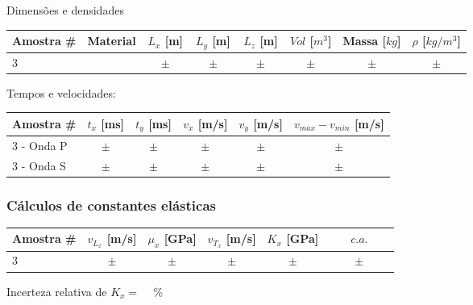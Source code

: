 \documentclass[a4paper,12pt]{article}  %
\begin{document}
Dimensões e densidades
\begin{center}
	\begin{tabular}{|l|c|c|c|c|c|c|c|}
	\hline
	 Amostra \# & Material  &  $L_x$ [m]  &   $L_y$ [m]  &  $L_z$ [m]  & $Vol$ [$m^3$]  & Massa [$kg$] & $\rho$ [$kg/m^3$] \\
	\hline \hline
	  3   &   & $ \quad \pm \quad $ &  $ \quad \pm \quad $ & $ \quad \pm \quad $ & $ \quad \pm \quad $ & $ \quad \pm \quad $ & $ \quad \pm \quad $ \\ \hline
	\end{tabular}
\end{center}

Tempos e velocidades:
\begin{center}
	\begin{tabular}{|l|c|c|c|c|c|}
	\hline
	  Amostra \# &   $t_x$ [ms]  &   $t_y$ [ms]  &  $v_x$ [m/s] & $v_y$ [m/s]  & 
	   $v_{max}-v_{min}$ [m/s]	\\
	\hline \hline
	 3 - Onda P   & $ \quad \pm \quad $ &  $ \quad \pm \quad $ & $ \quad \pm \quad $ & $\quad \pm \quad $ & $ \quad \pm \quad $ \\ \hline
	 3 - Onda S   & $ \quad \pm \quad $ &  $ \quad \pm \quad $ & $ \quad \pm \quad $ & $\quad \pm \quad $ & $ \quad \pm \quad $ \\ \hline
 	\end{tabular}
\end{center}

\subsubsection{\sf Cálculos de constantes elásticas}%

\begin{center}
	\begin{tabular}{|l|c|c|c|c|c|}
	\hline
	  Amostra \# &   $v_{L_x}$ [m/s]  &   $\mu_x$ [GPa]  &  $v_{T_x}$ [m/s] & $K_x$ [GPa] & $c.a.$   	\\
	\hline \hline
	  3   & $ \quad \pm \quad $ &  $ \quad \pm \quad $ & $ \quad \pm \quad $ & $ \quad \pm \quad $ & $ \qquad \pm \qquad $ \\ \hline
 	\end{tabular}
\end{center}
Incerteza relativa de $K_x=$ ~\underline{\makebox[1cm][r]{~}} \%
\end{document}
